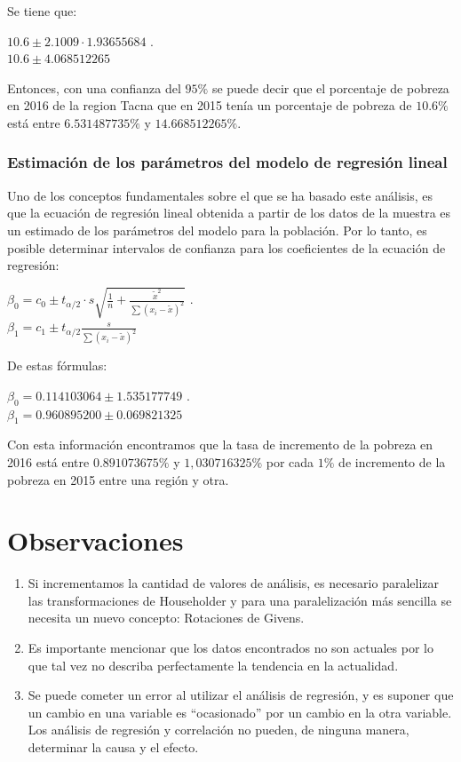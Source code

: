 \documentclass[twocolumn,twoside]{article}
\begin{document}
Se tiene que:
\begin{center}
  $10.6\pm2.1009\cdot1.93655684$  .\\
  $10.6\pm 4.068512265$ 
\end{center}

Entonces, con una confianza del $95\%$ se puede decir que el porcentaje de pobreza en 2016 de la 
region Tacna que en 2015 ten\'ia un porcentaje de pobreza de $10.6\%$ est\'a entre $6.531487735\% $
y $14.668512265\%$.

\subsubsection{Estimaci\'on de los par\'ametros del modelo de regresi\'on lineal}

Uno de los conceptos fundamentales sobre el que se ha basado este an\'alisis, es que la ecuaci\'on
de regresi\'on lineal obtenida a partir de los datos de la muestra es un estimado de los par\'ametros
del modelo para la poblaci\'on. Por lo tanto, es posible determinar intervalos de confianza para
los coeficientes de la ecuaci\'on de regresi\'on:
\begin{center}
  $\beta_0=c_0\pm t_{\alpha/2}\cdot s \sqrt{\frac{1}{n}+\frac{\tilde{x}^2}{\sum (x_i-\tilde x)^2}}$  .\\
  $\beta_1=c_1\pm t_{\alpha/2}\frac{s}{\sum (x_i-\tilde x)^2}$ 
\end{center}
De estas f\'ormulas:
\begin{center}
  $\beta_0=0.114103064\pm 1.535177749$  .\\
  $\beta_1=0.960895200 \pm  0.069821325$ 
\end{center}  
Con esta informaci\'on encontramos que la tasa de incremento de la pobreza en
2016 est\'a entre $0.891073675\%$ y $1,030716325\%$ por cada $1\%$ de incremento de la pobreza en 2015 entre una
regi\'on y otra.





\section{Observaciones}
\begin{enumerate}
\item Si incrementamos la cantidad de valores de an\'alisis, es necesario
      paralelizar las transformaciones de Householder y para una
      paralelizaci\'on m\'as sencilla se necesita un nuevo concepto:
      Rotaciones de Givens.
\item Es importante mencionar que los datos encontrados no son actuales por lo
que tal vez no describa perfectamente la tendencia en la actualidad.\\
\item Se puede cometer un error al utilizar el an\'alisis de regresi\'on, 
       y es suponer que un cambio en una variable es “ocasionado” por un cambio en la otra
       variable. Los an\'alisis de regresi\'on y correlaci\'on no pueden, de ninguna manera, 
       determinar la causa y el efecto.
\end{enumerate}
\end{document}
